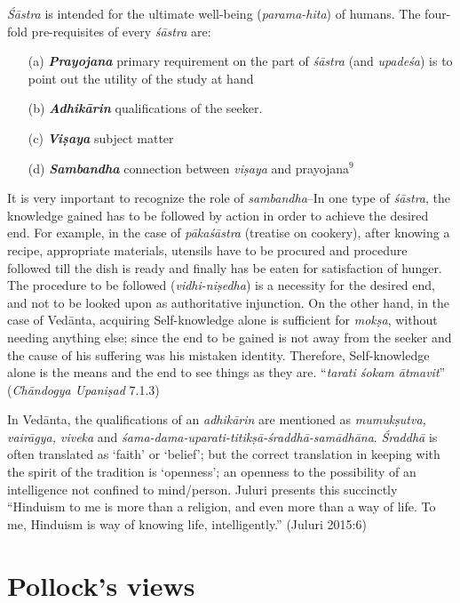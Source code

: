 {\sl Śāstra} is intended for the ultimate well-being ({\sl parama-hita}) of humans. The four-fold pre-requisites of every {\sl śāstra} are:
\begin{itemize}
\item[(a)] {{\sl\bfseries Prayojana}\relax} primary requirement on the part of {\sl śāstra} (and {\sl upadeśa}) is to point out the utility of the study at hand

\item[(b)] {{\sl\bfseries Adhikārin}\relax} qualiﬁcations of the seeker.

\item[(c)] {{\sl\bfseries Viṣaya}\relax} subject matter

\item[(d)] {{\sl\bfseries Sambandha}\relax} connection between {\sl viṣaya} and prayojana$^{9}$
\end{itemize}

It is very important to recognize the role of {\sl sambandha}--In one type of {\sl śāstra}, the knowledge gained has to be followed by action in order to achieve the desired end. For example, in the case of {\sl pākaśāstra} (treatise on cookery), after knowing a recipe, appropriate materials, utensils have to be procured and procedure followed till the dish is ready and ﬁnally has be eaten for satisfaction of hunger. The procedure to be followed ({\sl vidhi-niṣedha}) is a necessity for the desired end, and not to be looked upon as authoritative injunction. On the other hand, in the case of Vedānta, acquiring Self-knowledge alone is suﬃcient for {\sl mokṣa}, without needing anything else; since the end to be gained is not away from the seeker and the cause of his suﬀering was his mistaken identity. Therefore, Self-knowledge alone is the means and the end to see things as they are.  ``{\sl tarati śokam ātmavit}'' ({\sl Chāndogya Upaniṣad} 7.1.3)

In Vedānta, the qualiﬁcations of an {\sl adhikārin} are mentioned as {\sl mumukṣutva, vairāgya, viveka} and {\sl śama-dama-uparati-titikṣā-śraddhā-samādhāna}. {\sl Śraddhā} is often translated as `faith' or `belief'; but the correct translation in keeping with the spirit of the tradition is `openness'; an openness to the possibility of an intelligence not conﬁned to mind/person. Juluri presents this succinctly ``Hinduism to me is more than a religion, and even more than a way of life. To me, Hinduism is way of knowing life, intelligently.'' (Juluri 2015:6)

\section{Pollock's views}\label{art12-sec3}

